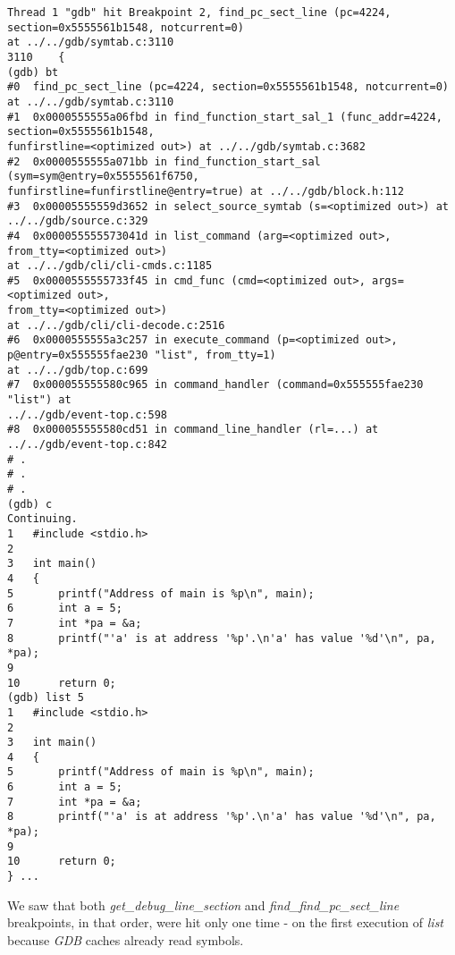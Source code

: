 \documentclass{report}
\begin{document}
\begin{verbatim}
Thread 1 "gdb" hit Breakpoint 2, find_pc_sect_line (pc=4224, 
section=0x5555561b1548, notcurrent=0)
at ../../gdb/symtab.c:3110
3110	{
(gdb) bt
#0  find_pc_sect_line (pc=4224, section=0x5555561b1548, notcurrent=0) 
at ../../gdb/symtab.c:3110
#1  0x0000555555a06fbd in find_function_start_sal_1 (func_addr=4224, 
section=0x5555561b1548, 
funfirstline=<optimized out>) at ../../gdb/symtab.c:3682
#2  0x0000555555a071bb in find_function_start_sal (sym=sym@entry=0x5555561f6750, 
funfirstline=funfirstline@entry=true) at ../../gdb/block.h:112
#3  0x00005555559d3652 in select_source_symtab (s=<optimized out>) at 
../../gdb/source.c:329
#4  0x000055555573041d in list_command (arg=<optimized out>, 
from_tty=<optimized out>)
at ../../gdb/cli/cli-cmds.c:1185
#5  0x0000555555733f45 in cmd_func (cmd=<optimized out>, args=<optimized out>, 
from_tty=<optimized out>)
at ../../gdb/cli/cli-decode.c:2516
#6  0x0000555555a3c257 in execute_command (p=<optimized out>, 
p@entry=0x555555fae230 "list", from_tty=1)
at ../../gdb/top.c:699
#7  0x000055555580c965 in command_handler (command=0x555555fae230 "list") at 
../../gdb/event-top.c:598
#8  0x000055555580cd51 in command_line_handler (rl=...) at 
../../gdb/event-top.c:842
# .
# .
# .
(gdb) c
Continuing.
1	#include <stdio.h>
2	
3	int main()
4	{
5		printf("Address of main is %p\n", main);
6		int a = 5;
7		int *pa = &a;
8		printf("'a' is at address '%p'.\n'a' has value '%d'\n", pa, *pa);
9	
10		return 0;
(gdb) list 5
1	#include <stdio.h>
2	
3	int main()
4	{
5		printf("Address of main is %p\n", main);
6		int a = 5;
7		int *pa = &a;
8		printf("'a' is at address '%p'.\n'a' has value '%d'\n", pa, *pa);
9	
10		return 0;
} ...
\end{verbatim}
We saw that both \textit{get\_debug\_line\_section} and \textit{find\_find\_pc\_sect\_line} breakpoints, in that order, were hit only one time - on the first execution of \textit{list} because \textit{GDB} caches already read symbols.
\end{document}

